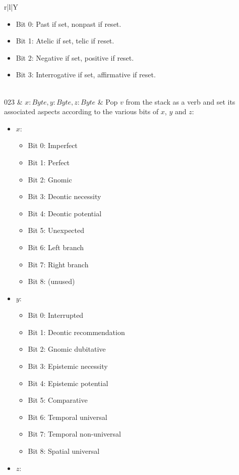 \documentclass{book}
\begin{document}
\begin{longtabu}[c]{r|l|Y}
    \begin{itemize}
        \item Bit 0: Past if set, nonpast if reset.
        \item Bit 1: Atelic if set, telic if reset.
        \item Bit 2: Negative if set, positive if reset.
        \item Bit 3: Interrogative if set, affirmative if reset.
    \end{itemize}
    \\
    023 & $x: Byte, y: Byte, z: Byte$ & Pop $v$ from the stack as a verb and set its associated aspects according to the various bits of $x$, $y$ and $z$:
    \begin{itemize}
        \item $x$:
        \begin{itemize}
            \item Bit 0: Imperfect
            \item Bit 1: Perfect
            \item Bit 2: Gnomic
            \item Bit 3: Deontic necessity
            \item Bit 4: Deontic potential
            \item Bit 5: Unexpected
            \item Bit 6: Left branch
            \item Bit 7: Right branch
            \item Bit 8: (unused)
        \end{itemize}
        \item $y$:
        \begin{itemize}
            \item Bit 0: Interrupted
            \item Bit 1: Deontic recommendation
            \item Bit 2: Gnomic dubitative
            \item Bit 3: Epistemic necessity
            \item Bit 4: Epistemic potential
            \item Bit 5: Comparative
            \item Bit 6: Temporal universal
            \item Bit 7: Temporal non-universal
            \item Bit 8: Spatial universal
        \end{itemize}
        \item $z$:

\end{itemize}
\end{longtabu}
\end{document}

